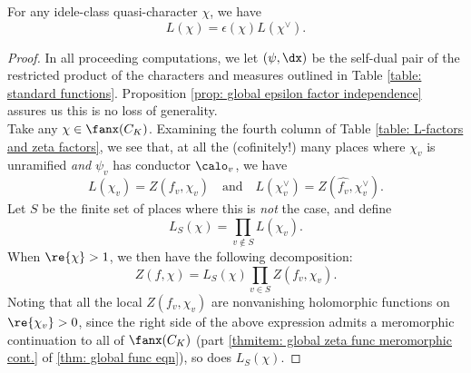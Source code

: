 \documentclass[11pt, x11names, openany]{book}
\begin{document}
\begin{theorem}
\label{thm: L-function functional eqn}
For any idele-class quasi-character $\chi$, we have
\begin{equation*}
    L(\chi) = \epsilon(\chi) L(\chi^\lor).
\end{equation*}
\end{theorem}
\begin{proof}
In all proceeding computations, we let $(\psi, \dx)$ be the self-dual pair of the restricted product of the characters and measures outlined in Table \ref{table: standard functions}. Proposition \ref{prop: global epsilon factor independence} assures us this is no loss of generality.\\
Take any $\chi \in \fanx(C_K)$. Examining the fourth column of Table \ref{table: L-factors and zeta factors}, we see that, at all the (cofinitely!) many places where $\chi_v$ is unramified \textit{and} $\psi_v$ has conductor $\calo_v$, we have
\begin{equation*}
    L(\chi_v) = Z(f_v, \chi_v) \quad \text{and} \quad L(\chi_v^\lor) = Z(\hat{f_v}, \chi_v^\lor).
\end{equation*}
Let $S$ be the finite set of places where this is \textit{not} the case, and define
\begin{equation*}
    L_S(\chi) = \prod_{v \notin S} L(\chi_v).
\end{equation*}
When $\re{\chi} > 1$, we then have the following decomposition:
\begin{equation*}
    Z(f, \chi) = L_S(\chi) \prod_{v \in S} Z(f_v, \chi_v).
\end{equation*}
Noting that all the local $Z(f_v, \chi_v)$ are nonvanishing holomorphic functions on $\re{\chi_v} > 0$, since the right side of the above expression admits a meromorphic continuation to all of $\fanx(C_K)$ (part \ref{thmitem: global zeta func meromorphic cont.} of \ref{thm: global func eqn}), so does $L_S(\chi)$.


\end{proof}
\end{document}
